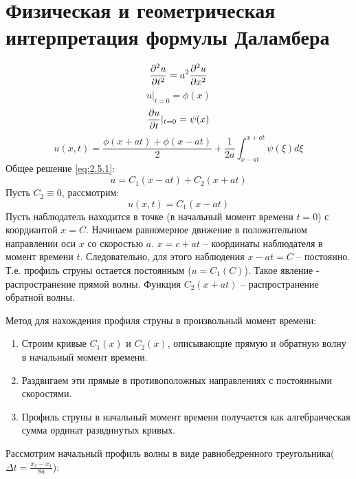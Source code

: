 \documentclass[../main.tex]{subfiles}
\begin{document}
\section{Физическая и геометрическая интерпретация формулы Даламбера}
\begin{equation}
	\label{eq:2.5.1}
	\frac{\partial ^2u}{\partial t^2}=a^2\frac{\partial ^2u}{\partial x^2}
\end{equation}
\begin{equation}
	u|_{t=0} = \phi(x)
\end{equation}
\begin{equation}
	\frac{\partial u}{\partial t}|_{t=0} = \psi(x)
\end{equation}
\begin{equation}
	u(x, t) = \frac{\phi(x + at) + \phi(x - at)}{2} + \frac{1}{2a}\int_{x-at}^{x+at}\psi(\xi)d\xi
\end{equation}
Общее решение \eqref{eq:2.5.1}:
$$
	u = C_1(x-at) + C_2(x+at)
$$
Пусть $C_2 \equiv 0$, рассмотрим:
$$
	u(x, t) = C_1(x - at)
$$
Пусть наблюдатель находится в точке (в начальный момент времени $t = 0$) с коордиантой $x = C$. Начинаем равномерное движение в положительном направлении оси $x$ со скоростью $a$.
$ x = c + at$ -- координаты наблюдателя в момент времени $t$. Следовательно, для этого наблюдения $x - at = C$ -- постоянно. Т.е. профиль струны остается постоянным ($u = C_1(C)$).
Такое явление - распространение прямой волны. Функция $C_2(x + at)$ -- распространение обратной волны.

Метод для нахождения профиля струны в произвольный момент времени:
\begin{enumerate}
	\item Строим кривые $C_1(x)$ и $C_2(x)$, описывающие прямую и обратную волну в начальный момент времени.
	\item Раздвигаем эти прямые в противоположных направлениях с постоянными скоростями.
	\item Профиль струны в начальный момент времени получается как алгебраическая сумма ординат развдинутых кривых.
\end{enumerate}
Рассмотрим начальный профиль волны в виде равнобедренного треугольника($\Delta t = \frac{x_2-x_1}{8a}$):
\end{document}
